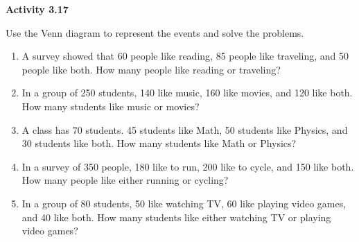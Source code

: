 \vspace{0.3ex}
\noindent\textbf{Activity 3.17}

\vspace{0.2ex}

Use the Venn diagram to represent the events and solve the problems.

\begin{enumerate}[label=\color{blue}\arabic*.]
    \item A survey showed that 60 people like reading, 85 people like traveling, and 50 people like both. How many people like reading or traveling?
    \item In a group of 250 students, 140 like music, 160 like movies, and 120 like both. How many students like music or movies?
    \item A class has 70 students. 45 students like Math, 50 students like Physics, and 30 students like both. How many students like Math or Physics?
    \item In a survey of 350 people, 180 like to run, 200 like to cycle, and 150 like both. How many people like either running or cycling?
    \item In a group of 80 students, 50 like watching TV, 60 like playing video games, and 40 like both. How many students like either watching TV or playing video games?
\end{enumerate}
